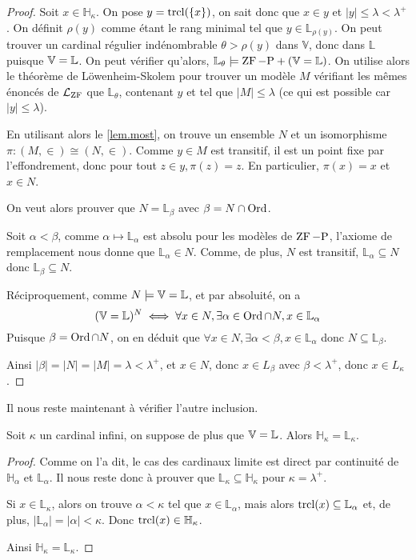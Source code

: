 \begin{proof}
  Soit $x \in \mathbb H_\kappa$. On pose $y = \operatorname{trcl}(\{x\})$, on sait donc que
  $x \in y$ et $|y| \leq \lambda < \lambda^+$. On définit $\rho(y)$ comme étant
  le rang minimal tel que $y\in\mathbb L_{\rho(y)}$. On peut trouver un cardinal
  régulier indénombrable $\theta > \rho(y)$ dans $\mathbb V$, donc dans
  $\mathbb L$ puisque $\mathbb V = \mathbb L$. On peut vérifier qu'alors,
  $\mathbb L_{\theta}\models \operatorname{ZF} - \mathrm{P} + (\mathbb V = \mathbb L)$. On utilise alors le
  théorème de Löwenheim-Skolem pour trouver un modèle $M$ vérifiant les mêmes
  énoncés de $\mathcal L_{\operatorname{ZF}}$ que $\mathbb L_{\theta}$, contenant
  $y$ et tel que $|M| \leq \lambda$ (ce qui est possible car $|y|\leq \lambda$).

  En utilisant alors le \cref{lem.most}, on trouve un ensemble $N$ et un
  isomorphisme $\pi : (M,\in)\cong (N,\in)$. Comme $y\in M$ est transitif, il
  est un point fixe par l'effondrement, donc pour tout $z\in y, \pi(z) = z$. En
  particulier, $\pi(x) = x$ et $x\in N$.

  On veut alors prouver que $N = \mathbb L_\beta$ avec $\beta = N\cap \operatorname{Ord}$.

  Soit $\alpha < \beta$, comme $\alpha \mapsto \mathbb L_\alpha$ est absolu
  pour les modèles de $\operatorname{ZF} - \mathrm{P}$, l'axiome de remplacement nous donne
  que $\mathbb L_\alpha \in N$. Comme, de plus, $N$ est transitif,
  $\mathbb L_\alpha \subseteq N$ donc $\mathbb L_\beta \subseteq N$.

  Réciproquement, comme $N\models \mathbb V = \mathbb L$, et par absoluité, on a
  \[(\mathbb V = \mathbb L)^N \iff \forall x \in N, \exists \alpha \in \operatorname{Ord}\cap N,
  x\in \mathbb L_\alpha\]
  Puisque $\beta = \operatorname{Ord} \cap N$, on en déduit que
  $\forall x \in N, \exists \alpha < \beta, x\in \mathbb L_\alpha$ donc
  $N\subseteq\mathbb L_\beta$.

  Ainsi $|\beta| = |N| = |M| = \lambda < \lambda^+$, et $x\in N$, donc
  $x\in L_\beta$ avec $\beta < \lambda^+$, donc $x\in L_\kappa$.
\end{proof}

Il nous reste maintenant à vérifier l'autre inclusion.

\begin{lemma}
  Soit $\kappa$ un cardinal infini, on suppose de plus que $\mathbb V = \mathbb L$. Alors
  $\mathbb H_\kappa = \mathbb L_\kappa$.
\end{lemma}

\begin{proof}
  Comme on l'a dit, le cas des cardinaux limite est direct par continuité de
  $\mathbb H_\alpha$ et $\mathbb L_\alpha$. Il nous reste donc à prouver que
  $\mathbb L_\kappa\subseteq \mathbb H_\kappa$ pour $\kappa = \lambda^+$.

  Si $x\in \mathbb L_\kappa$, alors on trouve $\alpha < \kappa$ tel que
  $x\in \mathbb L_\alpha$, mais alors $\operatorname{trcl}(x)\subseteq \mathbb L_\alpha$ et, de
  plus, $|\mathbb L_\alpha| = |\alpha| < \kappa$.
  Donc $\operatorname{trcl}(x)\in\mathbb H_\kappa$.

  Ainsi $\mathbb H_\kappa = \mathbb L_\kappa$.
\end{proof}

